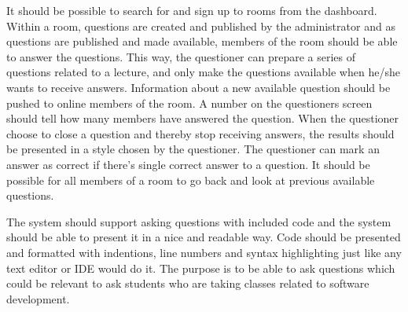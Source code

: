 \documentclass{article}
\begin{document}
It should be possible to search for and sign up to rooms from the dashboard. Within a room, questions are created and published by the administrator and as questions are published and made available, members of the room should be able to answer the questions. This way, the questioner can prepare a series of questions related to a lecture, and only make the questions available when he/she wants to receive answers. Information about a new available question should be pushed to online members of the room. A number on the questioners screen should tell how many members have answered the question. When the questioner choose to close a question and thereby stop receiving answers, the results should be presented in a style chosen by the questioner. The questioner can mark an answer as correct if there's single correct answer to a question. It should be possible for all members of a room to go back and look at previous available questions.

The system should support asking questions with included code and the system should be able to present it in a nice and readable way. Code should be presented and formatted with indentions, line numbers and syntax highlighting just like any text editor or IDE would do it. The purpose is to be able to ask questions which could be relevant to ask students who are taking classes related to software development.







\end{document}
